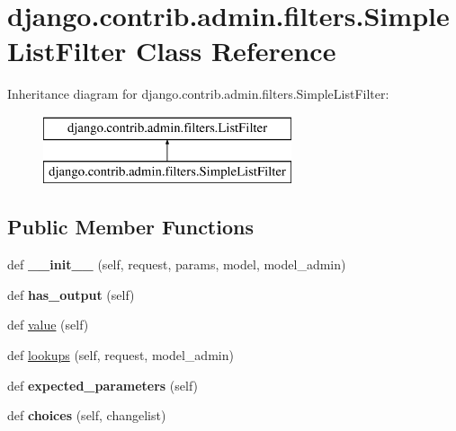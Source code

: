 \hypertarget{classdjango_1_1contrib_1_1admin_1_1filters_1_1_simple_list_filter}{}\section{django.\+contrib.\+admin.\+filters.\+Simple\+List\+Filter Class Reference}
\label{classdjango_1_1contrib_1_1admin_1_1filters_1_1_simple_list_filter}
Inheritance diagram for django.\+contrib.\+admin.\+filters.\+Simple\+List\+Filter\+:\begin{figure}[H]
\begin{center}
\leavevmode
\includegraphics[height=2.000000cm]{classdjango_1_1contrib_1_1admin_1_1filters_1_1_simple_list_filter}
\end{center}
\end{figure}
\subsection*{Public Member Functions}
\begin{DoxyCompactItemize}
\item 
\mbox{\label{classdjango_1_1contrib_1_1admin_1_1filters_1_1_simple_list_filter_a9616787fa5b98a41138cbb919322da6b}} 
def {\bfseries \+\_\+\+\_\+init\+\_\+\+\_\+} (self, request, params, model, model\+\_\+admin)
\item 
\mbox{\label{classdjango_1_1contrib_1_1admin_1_1filters_1_1_simple_list_filter_a5980a9fa20ac70e2f055baecedacb3c0}} 
def {\bfseries has\+\_\+output} (self)
\item 
def \mbox{\hyperlink{classdjango_1_1contrib_1_1admin_1_1filters_1_1_simple_list_filter_a097bd85958bebea50fff072924c45886}{value}} (self)
\item 
def \mbox{\hyperlink{classdjango_1_1contrib_1_1admin_1_1filters_1_1_simple_list_filter_ab26572954572952e450eafe9d3dfbfa6}{lookups}} (self, request, model\+\_\+admin)
\item 
\mbox{\label{classdjango_1_1contrib_1_1admin_1_1filters_1_1_simple_list_filter_a0e8ff695a2d06c94b4fa5e23221a4122}} 
def {\bfseries expected\+\_\+parameters} (self)
\item 
\mbox{\label{classdjango_1_1contrib_1_1admin_1_1filters_1_1_simple_list_filter_a0e43ccd6d895e294c99e48c1ca24ab38}} 
def {\bfseries choices} (self, changelist)
\end{DoxyCompactItemize}
